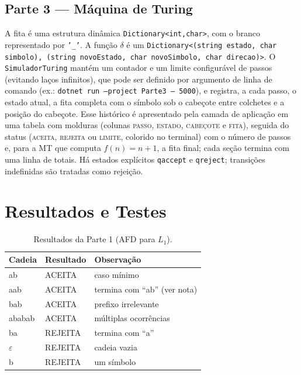 \documentclass[12pt,a4paper]{article}
\begin{document}
\subsection{Parte 3 --- Máquina de Turing}
A fita é uma estrutura dinâmica \texttt{Dictionary<int,char>}, com o branco
representado por \texttt{'\_'}. A função $\delta$ é um
\texttt{Dictionary<(string estado, char simbolo), (string novoEstado, char novoSimbolo, char direcao)>}.
O \texttt{SimuladorTuring} mantém um contador e um limite configurável de passos
(evitando laços infinitos), que pode ser definido por argumento de linha de
comando (ex.: \texttt{dotnet run --project Parte3 -- 5000}), e registra, a cada
passo, o estado atual, a fita completa com o símbolo sob o cabeçote entre
colchetes e a posição do cabeçote. Esse histórico é apresentado pela camada de
aplicação em uma tabela com molduras (colunas \textsc{passo}, \textsc{estado},
\textsc{cabeçote} e \textsc{fita}), seguida do status (\textsc{aceita},
\textsc{rejeita} ou \textsc{limite}, colorido no terminal) com o número de passos
e, para a MT que computa $f(n)=n+1$, a fita final; cada seção termina com uma
linha de totais. Há estados explícitos \texttt{qaccept} e \texttt{qreject};
transições indefinidas são tratadas como rejeição.

\section{Resultados e Testes}

\begin{table}[h]
\centering
\caption{Resultados da Parte 1 (AFD para $L_1$).}
\begin{tabular}{lll}
\toprule
Cadeia & Resultado & Observação \\
\midrule
ab      & ACEITA  & caso mínimo \\
aab     & ACEITA  & termina com ``ab'' (ver nota) \\
bab     & ACEITA  & prefixo irrelevante \\
ababab  & ACEITA  & múltiplas ocorrências \\
ba      & REJEITA & termina com ``a'' \\
$\varepsilon$ & REJEITA & cadeia vazia \\
b       & REJEITA & um símbolo \\
\bottomrule
\end{tabular}
\end{table}
\end{document}
